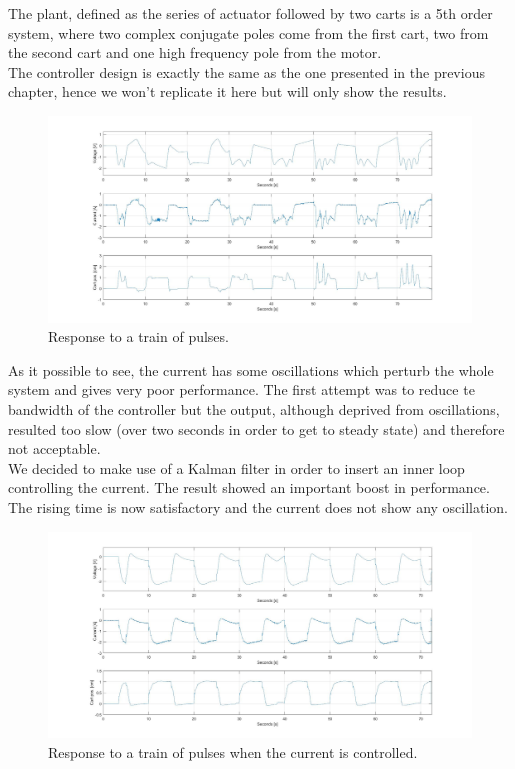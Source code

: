 The plant, defined as the series of actuator followed by two carts is a 5th order system, where two complex conjugate poles come from the first cart, two from the second cart and one high frequency pole from the motor.\\

The controller design is exactly the same as the one presented in the previous chapter, hence we won't replicate it here but will only show the results.\\


\begin{figure}[h]
\centering
\includegraphics[width=0.9\linewidth]{img/hinf_nocurr}
\caption{Response to a train of pulses.}
\label{fig:hinfnocurr}
\end{figure}

As it possible to see, the current has some oscillations which perturb the whole system and gives very poor performance. The first attempt was to reduce te bandwidth of the controller but the output, although deprived from oscillations, resulted too slow (over two seconds in order to get to steady state) and therefore not acceptable.\\

We decided to make use of a Kalman filter in order to insert an inner loop controlling the current. The result showed an important boost in performance. The rising time is now satisfactory and the current does not show any oscillation.\\

\begin{figure}[h]
	\centering
	\includegraphics[width=0.9\linewidth]{img/hinf_curr}
	\caption{Response to a train of pulses when the current is controlled.}
	\label{fig:hinfnocurr}
\end{figure}

